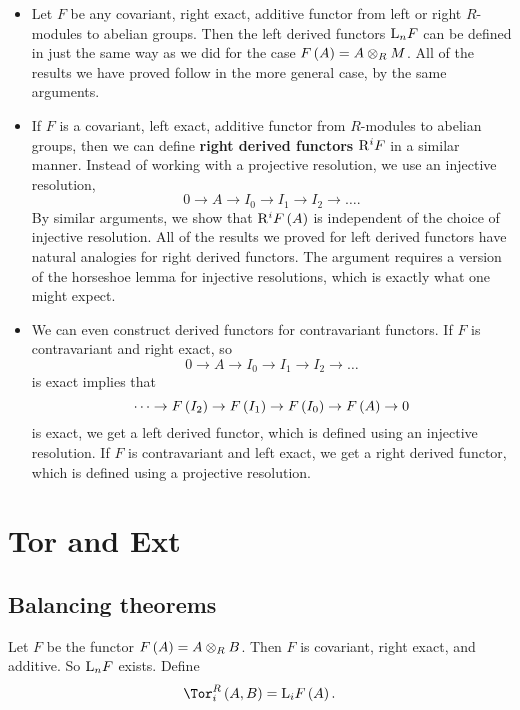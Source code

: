 \begin{proposition}
\hfill
\begin{itemize}
\item Let $ F $ be any covariant, right exact, additive functor from left or right $ R $-modules to abelian groups. Then the left derived functors $ \mathrm{L}_nF $ can be defined in just the same way as we did for the case $ F\br{A} = A \otimes_R M $. All of the results we have proved follow in the more general case, by the same arguments.
\item If $ F $ is a covariant, left exact, additive functor from $ R $-modules to abelian groups, then we can define \textbf{right derived functors} $ \mathrm{R}^iF $ in a similar manner. Instead of working with a projective resolution, we use an injective resolution,
$$ 0 \to A \to I_0 \to I_1 \to I_2 \to \dots. $$
By similar arguments, we show that $ \R^iF\br{A} $ is independent of the choice of injective resolution. All of the results we proved for left derived functors have natural analogies for right derived functors. The argument requires a version of the horseshoe lemma for injective resolutions, which is exactly what one might expect.
\item We can even construct derived functors for contravariant functors. If $ F $ is contravariant and right exact, so
$$ 0 \to A \to I_0 \to I_1 \to I_2 \to \dots $$
is exact implies that
$$ \dots \to F\br{I_2} \to F\br{I_1} \to F\br{I_0} \to F\br{A} \to 0 $$
is exact, we get a left derived functor, which is defined using an injective resolution. If $ F $ is contravariant and left exact, we get a right derived functor, which is defined using a projective resolution.
\end{itemize}
\end{proposition}

\pagebreak

\section{Tor and Ext}

\subsection{Balancing theorems}

\begin{definition}
Let $ F $ be the functor $ F\br{A} = A \otimes_R B $. Then $ F $ is covariant, right exact, and additive. So $ \mathrm{L}_nF $ exists. Define
$$ \Tor_i^R\br{A, B} = \L_iF\br{A}. $$
\end{definition}

